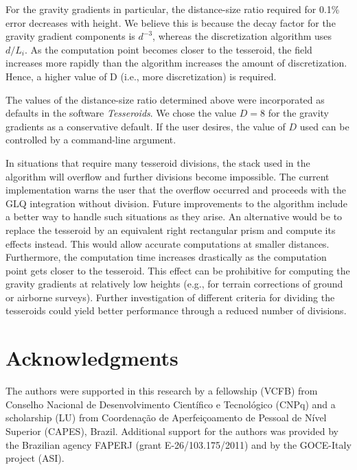 \documentclass[paper,twocolumn,twoside]{geophysics}
\begin{document}
For the gravity gradients in particular,
the distance-size ratio required for 0.1\% error decreases with height.
We believe this is because the decay factor for
the gravity gradient components is $d^{-3}$,
whereas the discretization algorithm uses $d/L_i$.
As the computation point becomes closer to the tesseroid,
the field increases more rapidly than
the algorithm increases the amount of discretization.
Hence, a higher value of D (i.e., more discretization)
is required.


The values of the distance-size ratio determined above were
incorporated as defaults in the software \emph{Tesseroids}.
We chose the value $D=8$ for the gravity gradients as a conservative default.
If the user desires, the value of $D$ used can be controlled by a command-line
argument.


In situations that require many tesseroid divisions,
the stack used in the algorithm will overflow and further
divisions become impossible.
The current implementation warns the user that
the overflow occurred and proceeds with the GLQ integration without division.
Future improvements to the algorithm include a better way to handle such
situations as they arise.
An alternative would be to replace the tesseroid by an equivalent
right rectangular prism and compute its effects instead.
This would allow accurate computations at smaller distances.
Furthermore,
the computation time increases drastically as the computation point
gets closer to the tesseroid.
This effect can be prohibitive for computing the gravity gradients at
relatively low heights (e.g., for terrain corrections of
ground or airborne surveys).
Further investigation of different criteria for dividing the tesseroids could
yield better performance through a reduced number of divisions.


\section{Acknowledgments}

The authors were supported in this research by
a fellowship (VCFB) from
Conselho Nacional de Desenvolvimento Cient\'ifico e Tecnol\'ogico (CNPq)
and a scholarship (LU) from
Coordena\c{c}\~ao de Aperfei\c{c}oamento de Pessoal de N\'ivel Superior
(CAPES),
Brazil.
Additional support for the authors was provided by
the Brazilian agency FAPERJ (grant E-26/103.175/2011)
and by the GOCE-Italy project (ASI).



\end{document}
